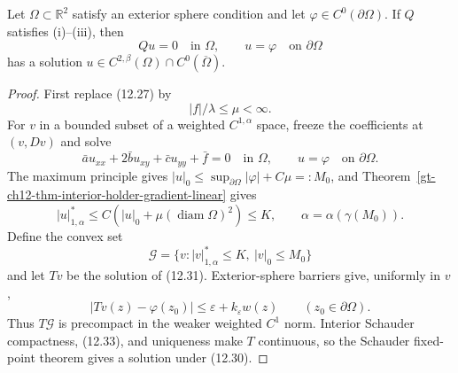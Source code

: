 \begin{theorem}
\label{gt-ch12-thm-dirichlet-uniformly-elliptic}
Let $\Omega\subset\mathbb R^2$ satisfy an exterior sphere condition and let
$\varphi\in C^0(\partial\Omega)$.  If $Q$ satisfies (i)--(iii), then
\begin{equation}\tag{12.29}
Qu=0\quad\text{in }\Omega,
\qquad u=\varphi\quad\text{on }\partial\Omega
\end{equation}
has a solution
$u\in C^{2,\beta}(\Omega)\cap C^0(\overline\Omega)$.
\end{theorem}
\begin{proof}
\sketch First replace (12.27) by
\begin{equation}\tag{12.30}
|f|/\lambda\le\mu<\infty.
\end{equation}
For $v$ in a bounded subset of a weighted $C^{1,\alpha}$ space, freeze the
coefficients at $(v,Dv)$ and solve
\begin{equation}\tag{12.31}
\bar a u_{xx}+2\bar b u_{xy}+\bar c u_{yy}+\bar f=0
\quad\text{in }\Omega,
\qquad u=\varphi\quad\text{on }\partial\Omega.
\end{equation}
The maximum principle gives
$|u|_0\le\sup_{\partial\Omega}|\varphi|+C\mu=:M_0$, and
Theorem~\ref{gt-ch12-thm-interior-holder-gradient-linear} gives
\begin{equation}\tag{12.32}
|u|^*_{1,\alpha}
\le C\left(|u|_0+\mu(\operatorname{diam}\Omega)^2\right)
\le K,
\qquad
\alpha=\alpha(\gamma(M_0)).
\end{equation}
Define the convex set
\[
\mathcal G=\{v:|v|^*_{1,\alpha}\le K,\ |v|_0\le M_0\}
\]
and let $Tv$ be the solution of (12.31).  Exterior-sphere barriers give,
uniformly in $v$,
\begin{equation}\tag{12.33}
|Tv(z)-\varphi(z_0)|
\le\varepsilon+k_\varepsilon w(z)
\qquad(z_0\in\partial\Omega).
\end{equation}
Thus $T\mathcal G$ is precompact in the weaker weighted $C^1$ norm.
Interior Schauder compactness, (12.33), and uniqueness make $T$ continuous,
so the Schauder fixed-point theorem gives a solution under (12.30).


\end{proof}
